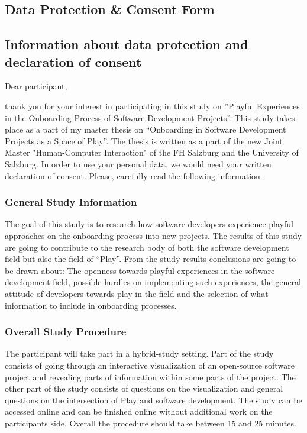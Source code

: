 \begin{appendices}

  \section{Data Protection \& Consent Form}
  \label{append:consent}

  \subsection*{Information about data protection and declaration of consent}

  Dear participant,

  thank you for your interest in participating in this study on ”Playful Experiences in the Onboarding Process of Software Development Projects”. This study takes place as a part of my master thesis on “Onboarding in Software Development Projects as a Space of Play”. The thesis is written as a part of the new Joint Master "Human-Computer Interaction" of the FH Salzburg and the University of Salzburg. In order to use your personal data, we would need your written declaration of consent. Please, carefully read the following information.

  \subsubsection*{General Study Information}

  The goal of this study is to research how software developers experience playful approaches on the onboarding process into new projects. The results of this study are going to contribute to the research body of both the software development field but also the field of “Play”. From the study results conclusions are going to be drawn about: The openness towards playful experiences in the software development field, possible hurdles on implementing such experiences, the general attitude of developers towards play in the field and the selection of what information to include in onboarding processes.

  \subsubsection*{Overall Study Procedure}

  The participant will take part in a hybrid-study setting. Part of the study consists of going through an interactive visualization of an open-source software project and revealing parts of information within some parts of the project. The other part of the study consists of questions on the visualization and general questions on the intersection of Play and software development. The study can be accessed online and can be finished online without additional work on the participants side. Overall the procedure should take between 15 and 25 minutes.


\end{appendices}
